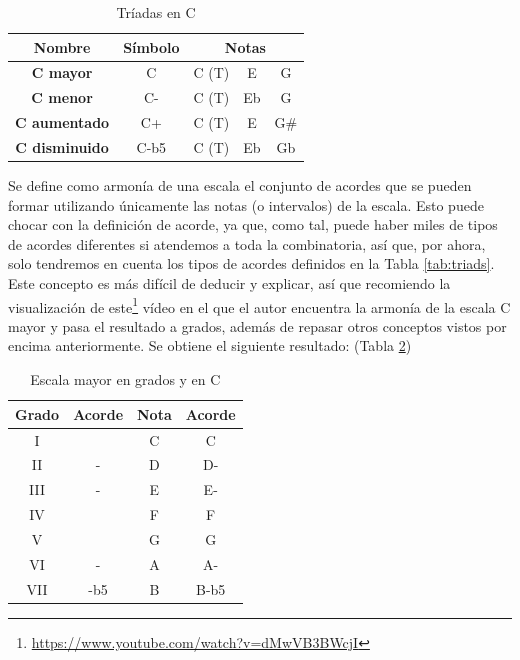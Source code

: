 \begin{table}[h]
    \centering
    \begin{tabular}{c|c|c|c|c}       
        \textbf{Nombre} & \textbf{Símbolo} & \multicolumn{3}{c}{\textbf{Notas}} \\
        \hline
        \hline
        \textbf{C mayor} & C & C (T) & E & G \\
        \hline
        \textbf{C menor} & C- & C (T) & Eb & G \\
        \hline
        \textbf{C aumentado} & C+ & C (T) & E & G\# \\
        \hline
        \textbf{C disminuido} & C-b5 & C (T) & Eb & Gb \\
    \end{tabular}
    \caption{Tríadas en C}
    \label{tab:triadsC}
\end{table}

\label{arm:armonia_escala}
Se define como armonía de una escala el conjunto de acordes que se pueden formar utilizando únicamente las notas (o intervalos) de la escala. Esto puede chocar con la definición de acorde, ya que, como tal, puede haber miles de tipos de acordes diferentes si atendemos a toda la combinatoria, así que, por ahora, solo tendremos en cuenta los tipos de acordes definidos en la Tabla \ref{tab:triads}. Este concepto es más difícil de deducir y explicar, así que recomiendo la visualización de este\footnote{\url{https://www.youtube.com/watch?v=dMwVB3BWcjI}} vídeo en el que el autor encuentra la armonía de la escala C mayor y pasa el resultado a grados, además de repasar otros conceptos vistos por encima anteriormente. Se obtiene el siguiente resultado: (Tabla \ref{tab:grados_C})

\begin{table}[h]
    \centering
    \begin{tabular}{c|c||c|c}
        \textbf{Grado} & \textbf{Acorde} & \textbf{Nota} & \textbf{Acorde} \\
        \hline
        I &  & C & C \\
        II & - & D & D- \\
        III & - & E & E- \\
        IV &  & F & F \\
        V &  & G & G \\
        VI & - & A & A- \\
        VII & -b5 & B & B-b5 \\
    \end{tabular}
    \caption{Escala mayor en grados y en C}
    \label{tab:grados_C}
\end{table}

